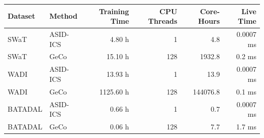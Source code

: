 \begin{tabular}{llrrrr}
\toprule
Dataset & Method & Training Time & CPU Threads & Core-Hours & Live Time \\
\midrule
SWaT & ASID-ICS & 4.80 h & 1 & 4.8 & 0.0007 ms \\
SWaT & GeCo & 15.10 h & 128 & 1932.8 & 0.2 ms \\
WADI & ASID-ICS & 13.93 h & 1 & 13.9 & 0.0007 ms \\
WADI & GeCo & 1125.60 h & 128 & 144076.8 & 0.1 ms \\
BATADAL & ASID-ICS & 0.66 h & 1 & 0.7 & 0.0007 ms \\
BATADAL & GeCo & 0.06 h & 128 & 7.7 & 1.7 ms \\
\bottomrule
\end{tabular}
